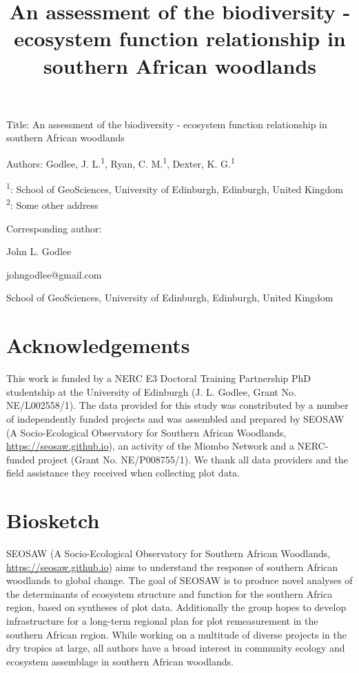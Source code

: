 \documentclass[11pt,a4paper]{article}
\title{An assessment of the biodiversity - ecosystem function relationship in southern African woodlands}
\author{}
\date{}
\begin{document}
{\LARGE{Title: An assessment of the biodiversity - ecosystem function relationship in southern African woodlands}}

\vspace{1cm}

Authors: Godlee, J. L.\textsuperscript{1}, Ryan, C. M.\textsuperscript{1}, Dexter, K. G.\textsuperscript{1}

\textsuperscript{1}: School of GeoSciences, University of Edinburgh, Edinburgh, United Kingdom \\
\textsuperscript{2}: Some other address

\vspace{1em}
Corresponding author:

John L. Godlee

johngodlee@gmail.com

School of GeoSciences, University of Edinburgh, Edinburgh, United Kingdom


\section{Acknowledgements}

This work is funded by a NERC E3 Doctoral Training Partnership PhD studentship at the University of Edinburgh (J. L. Godlee, Grant No. NE/L002558/1). The data provided for this study was constributed by a number of independently funded projects and was assembled and prepared by SEOSAW (A Socio-Ecological Observatory for Southern African Woodlands, \url{https://seosaw.github.io}), an activity of the Miombo Network and a NERC-funded project (Grant No. NE/P008755/1). We thank all data providers and the field assistance they received when collecting plot data. 

\section{Biosketch}

SEOSAW (A Socio-Ecological Observatory for Southern African Woodlands, \url{https://seosaw.github.io}) aims to understand the response of southern African woodlands to global change. The goal of SEOSAW is to produce novel analyses of the determinants of ecosystem structure and function for the southern Africa region, based on syntheses of plot data. Additionally the group hopes to develop infrastructure for a long-term regional plan for plot remeasurement in the southern African region. While working on a multitude of diverse projects in the dry tropics at large, all authors have a broad interest in community ecology and ecosystem assemblage in southern African woodlands.
\end{document}
